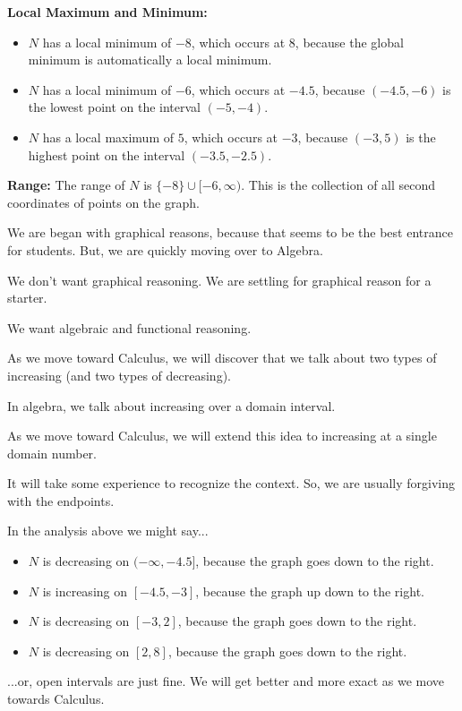 \documentclass{ximera}
\begin{document}
\begin{example}
\textbf{Local Maximum and Minimum:} 

\begin{itemize}
     \item $N$ has a local minimum of $-8$, which occurs at $8$, because the global minimum is automatically a local minimum.
     \item $N$ has a local minimum of $-6$, which occurs at $-4.5$, because $(-4.5, -6)$ is the lowest point on the interval $(-5, -4)$.
     \item $N$ has a local maximum of $5$, which occurs at $-3$, because $(-3, 5)$ is the highest point on the interval $(-3.5, -2.5)$.

\end{itemize}

\textbf{Range:} The range of $N$ is $\{ -8 \} \cup [-6, \infty)$. This is the collection of all second coordinates of points on the graph.


\end{example}



We are began with graphical reasons, because that seems to be the best entrance for students.  But, we are quickly moving over to Algebra.  

We don't want graphical reasoning. We are settling for graphical reason for a starter.

We want algebraic and functional reasoning.







\begin{observation}

As we move toward Calculus, we will discover that we talk about two types of increasing (and two types of decreasing). 

In algebra, we talk about increasing over a domain interval. 

As we move toward Calculus, we will extend this idea to increasing at a single domain number. 


It will take some experience to recognize the context.  So, we are usually forgiving with the endpoints. 

In the analysis above we might say...


\begin{itemize}
     \item $N$ is decreasing on $(-\infty, -4.5]$, because the graph goes down to the right.
     \item $N$ is increasing on $[-4.5, -3]$, because the graph up down to the right.
     \item $N$ is decreasing on $[-3, 2]$, because the graph goes down to the right.
     \item $N$ is decreasing on $[2, 8]$, because the graph goes down to the right.
\end{itemize}


...or, open intervals are just fine. We will get better and more exact as we move towards Calculus.



\end{observation}
\end{document}
